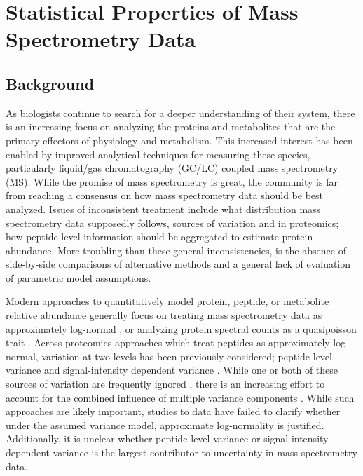 \section{Statistical Properties of Mass Spectrometry Data}

\subsection{Background}

As biologists continue to search for a deeper understanding of their system, there is an increasing focus on analyzing the proteins and metabolites that are the primary effectors of physiology and metabolism. This increased interest has been enabled by improved analytical techniques for measuring these species, particularly liquid/gas chromatography (GC/LC) coupled mass spectrometry (MS). While the promise of mass spectrometry is great, the community is far from reaching a consensus on how mass spectrometry data should be best analyzed.  Issues of inconsistent treatment include what distribution mass spectrometry data supposedly follows, sources of variation and in proteomics; how peptide-level information should be aggregated to estimate protein abundance. More troubling than these general inconsistencies, is the absence of side-by-side comparisons of alternative methods and a general lack of evaluation of parametric model assumptions. 

Modern approaches to quantitatively model protein, peptide, or metabolite relative abundance generally focus on treating mass spectrometry data as approximately log-normal \cite{Cox:2008ir, Oberg:2012bm,Navarro:2014ke, Breunig:2014bu}, or analyzing protein spectral counts as a quasipoisson trait \cite{Li:2010bj}. Across proteomics approaches which treat peptides as approximately log-normal, variation at two levels has been previously considered; peptide-level variance \cite{Navarro:2014ke} and signal-intensity dependent variance \cite{Zhu:2011jr,Oberg:2012bm,Navarro:2014ke}. While one or both of these sources of variation are frequently ignored \cite{Oberg:2012bm}, there is an increasing effort to account for the combined influence of multiple variance components \cite{Navarro:2014ke}. While such approaches are likely important, studies to data have failed to clarify whether under the assumed variance model, approximate log-normality is justified. Additionally, it is unclear whether peptide-level variance or signal-intensity dependent variance is the largest contributor to uncertainty in mass spectrometry data.

